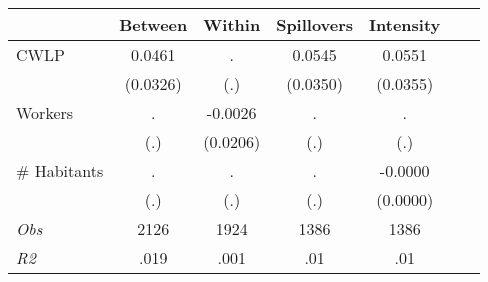 \begin{tabular}{l*{6}{c}}\hline&\multicolumn{1}{c}{Between}&\multicolumn{1}{c}{Within}&\multicolumn{1}{c}{Spillovers}&\multicolumn{1}{c}{Intensity}\\ \hline 
CWLP & 0.0461 & . & 0.0545 & 0.0551 \\
 & (0.0326) & (.) & (0.0350) & (0.0355) \\
Workers & . & -0.0026 & . & . \\
 & (.) & (0.0206) & (.) & (.) \\
\# Habitants & . & . & . & -0.0000 \\
  & (.) & (.) & (.) & (0.0000) \\
\hline \textit{Obs} & 2126 & 1924 & 1386 & 1386  \\ \textit{R2} & .019 & .001 & .01 & .01 \\ \hline \end{tabular}
